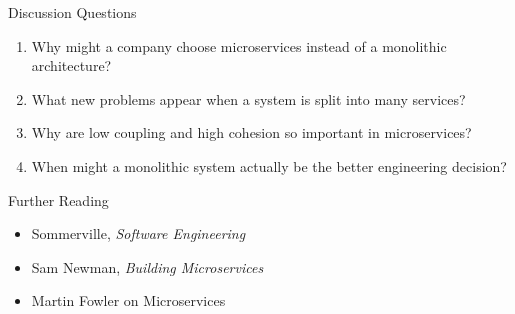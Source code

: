 \begin{frame}{Discussion Questions}
\begin{enumerate}
    \item Why might a company choose microservices instead of a monolithic architecture?
    \item What new problems appear when a system is split into many services?
    \item Why are low coupling and high cohesion so important in microservices?
    \item When might a monolithic system actually be the better engineering decision?
\end{enumerate}
\end{frame}

\begin{frame}{Further Reading}
\begin{itemize}
    \item Sommerville, \textit{Software Engineering}
    \item Sam Newman, \textit{Building Microservices}
    \item Martin Fowler on Microservices
\end{itemize}
\end{frame}
